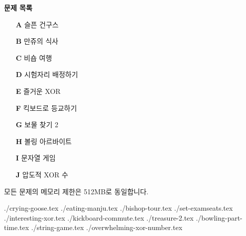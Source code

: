 \documentclass[10pt,a4paper,oneside,dvipsnames]{article}
\newcommand{\importproblem}[1]{{./#1.tex}}
\begin{document}
\BuildContestTitle


\begin{center}
    \textbf{\Large\textsf{문제 목록}}
\end{center}


\begin{center}
    \begin{minipage}{0.35\textwidth}
        \begin{itemize}
            
	\item[\textbf{A}] 슬픈 건구스
	\item[\textbf{B}] 만쥬의 식사
	\item[\textbf{C}] 비숍 여행
	\item[\textbf{D}] 시험자리 배정하기
	\item[\textbf{E}] 즐거운 XOR
	\item[\textbf{F}] 킥보드로 등교하기
	\item[\textbf{G}] 보물 찾기 2
	\item[\textbf{H}] 볼링 아르바이트
	\item[\textbf{I}] 문자열 게임
	\item[\textbf{J}] 압도적 XOR 수


        \end{itemize}    
    \end{minipage}
\end{center}

모든 문제의 메모리 제한은 512MB로 동일합니다.
\newpage

\importproblem{crying-goose}
\importproblem{eating-manju} 
\importproblem{bishop-tour} 
\importproblem{set-examseats} 
\importproblem{interesting-xor} 
\importproblem{kickboard-commute} 
\importproblem{treasure-2} 
\importproblem{bowling-part-time}
\importproblem{string-game} 
\importproblem{overwhelming-xor-number} 
\end{document}

